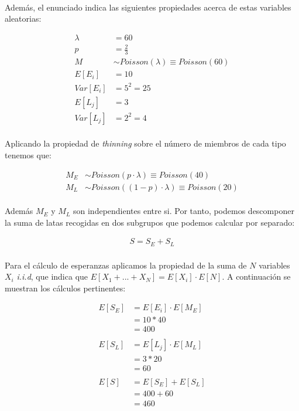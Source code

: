 \documentclass[a4paper, spanish]{article}
\begin{document}
    \paragraph{}
    Además, el enunciado indica las siguientes propiedades acerca de estas variables aleatorias:

    \begin{align*}
      \lambda &= 60 \\
      p &= \frac{2}{3} \\
      M &\sim Poisson(\lambda) \equiv Poisson(60) \\
      E[E_i] &= 10 \\
      Var[E_i] &= 5 ^ 2 = 25 \\
      E[L_j] &= 3 \\
      Var[L_j] &= 2^2 = 4
    \end{align*}

    \paragraph{}
    Aplicando la propiedad de \emph{thinning} sobre el número de miembros de cada tipo tenemos que:

    \begin{align*}
      M_E &\sim Poisson(p \cdot \lambda) \equiv Poisson(40) \\
      M_L &\sim Poisson((1 - p) \cdot \lambda) \equiv Poisson(20)
    \end{align*}

    \paragraph{}
    Además $M_E$ y $M_L$ son independientes entre si. Por tanto, podemos descomponer la suma de latas recogidas en dos subgrupos que podemos calcular por separado:

    \begin{align*}
      S = S_E + S_L
    \end{align*}

    \paragraph{}
    Para el cálculo de esperanzas aplicamos la propiedad de la suma de $N$ variables $X_i$ \emph{i.i.d}, que indica que $E[X_1 + ... + X_N] = E[X_i] \cdot E[N]$. A continuación se muestran los cálculos pertinentes:

    \begin{align*}
      E[S_E]
      &= E[E_i] \cdot E[M_E]\\
      &= 10 * 40 \\
      &= 400 \\
      \\
      E[S_L]
      &= E[L_j] \cdot E[M_L] \\
      &= 3 * 20 \\
      &= 60 \\ 
      \\
      E[S]
      &= E[S_E] + E[S_L] \\
      &= 400 + 60 \\
      &= 460
    \end{align*}
\end{document}
